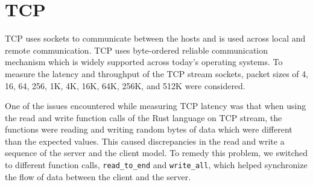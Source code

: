 \section{TCP}
TCP uses sockets to communicate between the hosts and is used across local and remote communication. TCP uses byte-ordered reliable communication mechanism which is widely supported across today's operating systems. To measure the latency and throughput of the TCP stream sockets, packet sizes of 4, 16, 64, 256, 1K, 4K, 16K, 64K, 256K, and 512K were considered.

One of the issues encountered while measuring TCP latency was that when using the read and write function calls of the Rust language on TCP stream, the functions were reading and writing random bytes of data which were different than the expected values. This caused discrepancies in the read and write a sequence of the server and the client model. To remedy this problem, we switched to different function calls, \texttt{read\_to\_end} and \texttt{write\_all}, which helped synchronize the flow of data between the client and the server.

